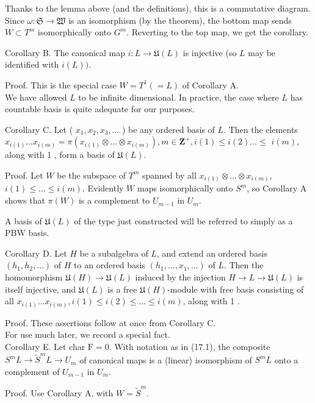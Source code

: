 \documentclass[10pt]{article}
\begin{document}
Thanks to the lemma above (and the definitions), this is a commutative diagram. Since $\omega: \mathfrak{S} \rightarrow \mathfrak{W}$ is an isomorphism (by the theorem), the bottom map sends $W \subset T^{m}$ isomorphically onto $G^{m}$. Reverting to the top map, we get the corollary.

Corollary B. The canonical map $i: L \rightarrow \mathfrak{U}(L)$ is injective (so $L$ may be identified with $i(L))$.

Proof. This is the special case $W=T^{1}(=L)$ of Corollary A.\\
We have allowed $L$ to be infinite dimensional. In practice, the case where $L$ has countable basis is quite adequate for our purposes.

Corollary C. Let ( $x_{1}, x_{2}, x_{3}, \ldots$ ) be any ordered basis of $L$. Then the elements $x_{i(1)} \ldots x_{i(m)}=\pi\left(x_{i(1)} \otimes \ldots \otimes x_{i(m)}\right), m \in \mathbf{Z}^{+}, i(1) \leq i(2) \ldots \leq$ $i(m)$, along with 1 , form a basis of $\mathfrak{U}(L)$.

Proof. Let $W$ be the subspace of $T^{m}$ spanned by all $x_{i(1)} \otimes \ldots \otimes x_{i(m)}$, $i(1) \leq \ldots \leq i(m)$. Evidently $W$ maps isomorphically onto $S^{m}$, so Corollary A shows that $\pi(W)$ is a complement to $U_{m-1}$ in $U_{m}$.

A basis of $\mathfrak{U}(L)$ of the type just constructed will be referred to simply as a PBW basis.

Corollary D. Let $H$ be a subalgebra of $L$, and extend an ordered basis $\left(h_{1}, h_{2}, \ldots\right)$ of $H$ to an ordered basis $\left(h_{1}, \ldots, x_{1}, \ldots\right)$ of $L$. Then the homomorphism $\mathfrak{U}(H) \rightarrow \mathfrak{U}(L)$ induced by the injection $H \rightarrow L \rightarrow \mathfrak{U}(L)$ is itself injective, and $\mathfrak{U}(L)$ is a free $\mathfrak{U}(H)$-module with free basis consisting of all $x_{i(1)} \ldots x_{i(m)}, i(1) \leq i(2) \leq \ldots \leq i(m)$, along with 1 .

Proof. These assertions follow at once from Corollary C.\\
For use much later, we record a special fact.\\
Corollary E. Let char $\mathrm{F}=0$. With notation as in (17.1), the composite $S^{m} L \rightarrow \widetilde{S}^{m} L \rightarrow U_{m}$ of canonical maps is a (linear) isomorphism of $S^{m} L$ onto a complement of $U_{m-1}$ in $U_{m}$.

Proof. Use Corollary A, with $W=\widetilde{S}^{m}$.
\end{document}

